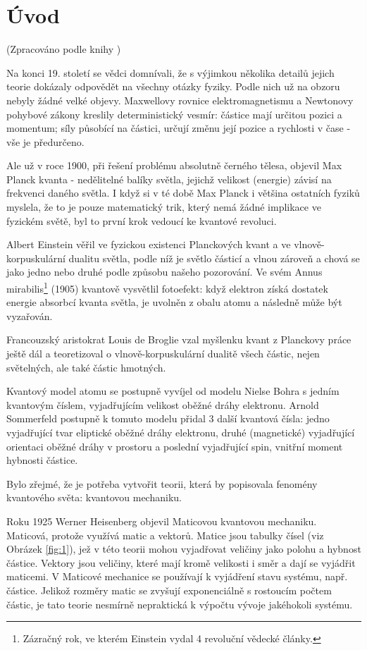 \section*{Úvod}
\label{sec:intro}
(Zpracováno podle knihy \cite{quantum})

Na konci 19. století se vědci domnívali, že s výjimkou několika detailů jejich teorie dokázaly odpovědět na všechny otázky fyziky. Podle nich už na obzoru nebyly žádné velké objevy. Maxwellovy rovnice elektromagnetismu a Newtonovy pohybové zákony kreslily deterministický vesmír: částice mají určitou pozici a momentum; síly působící na částici, určují změnu její pozice a rychlosti v čase - vše je předurčeno.

Ale už v roce 1900, při řešení problému absolutně černého tělesa, objevil Max Planck kvanta - nedělitelné balíky světla, jejichž velikost (energie) závisí na frekvenci daného světla. I když si v té době Max Planck i většina ostatních fyziků myslela, že to je pouze matematický trik, který nemá žádné implikace ve fyzickém světě, byl to první krok vedoucí ke kvantové revoluci.

Albert Einstein věřil ve fyzickou existenci Planckových kvant a ve vlnově-korpusku\-lární dualitu světla, podle níž je světlo částicí a vlnou zároveň a chová se jako jedno nebo druhé podle způsobu našeho pozorování. Ve svém Annus mirabilis\footnote[1]{Zázračný rok, ve kterém Einstein vydal 4 revoluční vědecké články.} (1905) kvantově vysvětlil fotoefekt: když elektron získá dostatek energie absorbcí kvanta světla, je uvolněn z obalu atomu a následně může být vyzařován.

Francouzský aristokrat Louis de Broglie vzal myšlenku kvant z Planckovy práce ještě dál a teoretizoval o vlnově-korpuskulární dualitě všech částic, nejen světelných, ale také částic hmotných.

Kvantový model atomu se postupně vyvíjel od modelu Nielse Bohra s jedním kvantovým číslem, vyjadřujícím velikost oběžné dráhy elektronu. Arnold Sommerfeld postupně k tomuto modelu přidal 3 další kvantová čísla: jedno vyjadřující tvar eliptické oběžné dráhy elektronu, druhé (magnetické) vyjadřující orientaci oběžné dráhy v prostoru a poslední vyjadřující spin, vnitřní moment hybnosti částice.

Bylo zřejmé, že je potřeba vytvořit teorii, která by popisovala fenomény kvantového světa: kvantovou mechaniku.

Roku 1925 Werner Heisenberg objevil Maticovou kvantovou mechaniku. Maticová, protože využívá matic a vektorů. Matice jsou tabulky čísel (viz Obrázek \ref{fig:1}), jež v této teorii mohou vyjadřovat veličiny jako polohu a hybnost částice. Vektory jsou veličiny, které mají kromě velikosti i směr a dají se vyjádřit maticemi. V Maticové mechanice se používají k vyjádření stavu systému, např. částice. Jelikož rozměry matic se zvyšují exponenciálně s rostoucím počtem částic, je tato teorie nesmírně nepraktická k výpočtu vývoje jakéhokoli systému.

